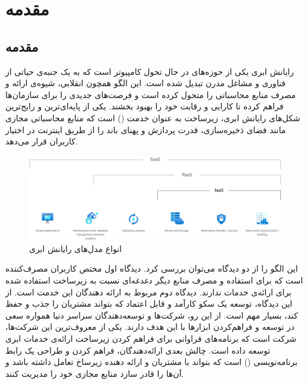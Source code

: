 \chapter{مقدمه}
\section{مقدمه}
رایانش ابری یکی از حوزه‌های در حال تحول کامپیوتر است که به یک جنبه‌ی حیاتی از فناوری و مشاغل مدرن تبدیل شده است. این الگو همچون انقلابی، شیوه‌ی ارائه و مصرف منابع محاسباتی را متحول کرده است و فرصت‌های جدیدی را برای سازمان‌ها فراهم کرده تا کارایی و رقابت خود را بهبود بخشند. یکی از پایه‌ای‌ترین و رایج‌ترین شکل‌های رایانش ابری، زیرساخت به عنوان خدمت () است که منابع محاسباتی مجازی مانند فضای ذخیره‌سازی، قدرت پردازش و پهنای باند را از طریق اینترنت در اختیار کاربران قرار می‌دهد.\cite{Mell_2011}

\begin{figure}[h]
	\vspace{1cm}
	\centering
	\includegraphics[scale=0.35]{figures/cloud_computing_models.png}
	\caption{انواع مدل‌های رایانش ابری\cite{microsoft_cc_models}}
	\label{fig:cc_models}
\end{figure}

این الگو را از دو دیدگاه می‌توان بررسی کرد. دیدگاه اول مختص کاربران مصرف‌کننده است که برای استفاده و مصرف منابع دیگر دغدغه‌ای نسبت به زیرساخت استفاده شده برای ارائه‌ی خدمات ندارند. دیدگاه دوم مربوط به ارائه دهندگان این خدمت است. از این دیدگاه، توسعه یک سکو کارآمد و قابل اعتماد که بتواند مشتریان را جذب و حفظ کند، بسیار مهم است. از این رو، شرکت‌ها و توسعه‌دهندگان سراسر دنیا همواره سعی در توسعه و فراهم‌کردن ابزارها با این هدف دارند. یکی از معروف‌ترین این شرکت‌ها، شرکت  است که برنامه‌های فراوانی برای فراهم کردن زیرساخت ارائه‌ی خدمات ابری توسعه داده است. چالش بعدی ارائه‌دهندگان، فراهم کردن و طراحی یک رابط برنامه‌نویسی () است که بتواند با مشتریان و ارائه دهنده زیرساخ تعامل داشته باشد و آن‌ها را قادر سازد منابع مجازی خود را مدیریت کنند.
